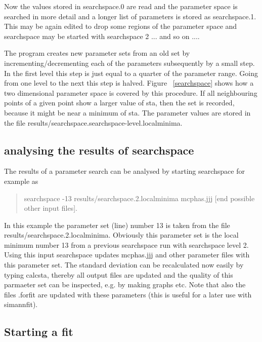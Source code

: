 Now the values stored in {\prg searchspace.0} are read and 
the parameter space is searched in more detail and a longer list 
of parameters is stored as {\prg searchspace.1}. This may be again
edited to drop some regions of the parameter space and {\prg searchspace}
may be started with {\prg searchspace 2 ...} and so on ....

The program creates new parameter sets from an old set by incrementing/decrementing
each of the parameters subsequently by a small step. In the first level this step
is just equal to a quarter of the parameter range. Going from one level to
 the next this step is halved. Figure ~\ref{searchspace} shows how a two dimensional
 parameter space is covered by this procedure. If all neighbouring points of
 a given point show a larger value of {\prg sta}, then the set is recorded, because it might be
 near a minimum of {\prg sta}. The parameter values are stored in the file
 {\prg results/searchspace.searchspace-level.localminima}.

\subsection{analysing the results of {\prg searchspace}}

The results of a parameter search can be analysed by starting searchspace for example as

\begin{quote}
{\prg searchspace -13 results/searchspace.2.localminima mcphas.jjj [end possible other input files]}.
\end{quote}

In this example the parameter set (line) number 13 is taken from the
 file {\prg results/searchspace.2.localminima}. Obviously this parameter set is the local minimum number 13
from a previous searchspace run with searchspace level 2. Using this input
 searchspace updates {\prg mcphas.jjj} and
other parameter files with this parameter set.
The standard deviation can be recalculated now easily by typing {\prg calcsta}, thereby all
output files are updated and the quality of this parmaeter set can be inspected, e.g. by
making graphs etc.
Note that also the files {\prg *.forfit} are updated with
these parameters (this is useful for a later use with {\prg simannfit}).

\subsection{Starting a fit}

